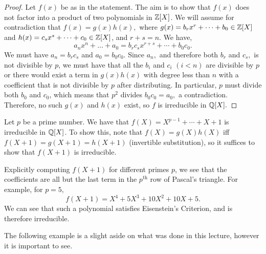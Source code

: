 \begin{proof}
    Let $f(x)$ be as in the statement. The aim is to show that $f(x)$ does not factor into a product of two polynomials in $\mathbb Z[X]$. We will assume for contradiction that $f(x)=g(x)h(x),$ where $g(x)=b_rx^r+\cdots +b_0 \in \mathbb Z[X]$ and $h(x)=c_sx^s+\cdots +c_0 \in \mathbb Z[X]$, and $r+s=n.$ We have, $$a_nx^n+\ldots +a_0 = b_rc_sx^{r+s}+\cdots +b_0c_0.$$ We must have $a_n=b_rc_s$ and $a_0=b_0c_0.$ Since $a_n,$ and therefore both $b_r$ and $c_s,$ is not divisible by $p$, we must have that all the $b_i$ and $c_i$ $(i < n)$ are divisible by $p$ or there would exist a term in $g(x)h(x)$ with degree less than $n$ with a coefficient that is not divisible by $p$ after distributing. In particular, $p$ must divide both $b_0$ and $c_0$, which means that $p^2$ divides $b_0c_0=a_0,$ a contradiction. Therefore, no such $g(x)$ and $h(x)$ exist, so $f$ is irreducible in $\mathbb Q[X].$
\end{proof}


\begin{example}
  Let $p$ be a prime number. We have that $f(X)=X^{p-1}+\cdots+X+1$ is irreducible in
  $\mathbb Q[X]$. To show this, note that $f(X)=g(X)h(X)$ iff $f(X+1)=g(X+1)=h(X+1)$ (invertible
  substitution), so it suffices to show that $f(X+1)$ is irreducible. 

  Explicitly computing $f(X+1)$ for different primes $p$, we see that the coefficients are all but the last term in the $p^{\text{th}}$ row of Pascal's triangle. For example, for $p=5,$ 
  $$
  f(X+1) = X^4 + 5X^3 + 10X^2 + 10X + 5.
  $$
  We can see that such a polynomial satisfies Eisenstein's Criterion, and is therefore irreducible.
  \label{eisensteinex}
\end{example}

The following example is a slight aside on what was done in this lecture, however it is important to see.


